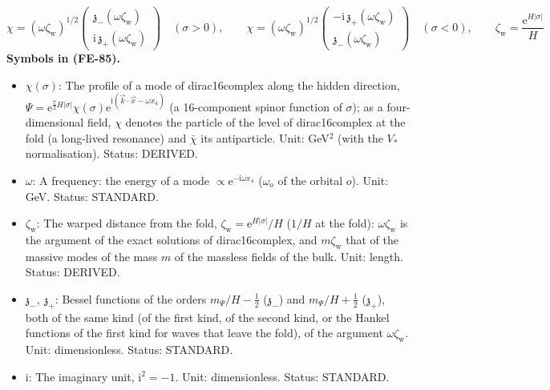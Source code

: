 \documentclass[
  10pt,
]{article}
\providecommand{\tightlist}{%
  \setlength{\itemsep}{0pt}\setlength{\parskip}{0pt}}
\begin{document}
\[
\chi = (\omega\zeta_{\mathrm{w}})^{1/2}\begin{pmatrix}\mathfrak{z}_-(\omega\zeta_{\mathrm{w}})\\ \mathrm{i}\,\mathfrak{z}_+(\omega\zeta_{\mathrm{w}})\end{pmatrix}\quad(\sigma > 0),\qquad
\chi = (\omega\zeta_{\mathrm{w}})^{1/2}\begin{pmatrix}-\mathrm{i}\,\mathfrak{z}_+(\omega\zeta_{\mathrm{w}})\\ \mathfrak{z}_-(\omega\zeta_{\mathrm{w}})\end{pmatrix}\quad(\sigma < 0),\qquad
\zeta_{\mathrm{w}} = \frac{\mathrm{e}^{H\lvert\sigma\rvert}}{H} \tag{FE-85}
\] \textbf{Symbols in (FE-85).}

\begin{itemize}
\tightlist
\item
  \(\chi(\sigma)\): The profile of a mode of dirac16complex along the
  hidden direction,
  \(\Psi = \mathrm{e}^{\frac72H\lvert\sigma\rvert}\chi(\sigma)\mathrm{e}^{\mathrm{i}(\vec k\cdot\vec x - \omega x_4)}\)
  (a 16-component spinor function of \(\sigma\)); as a four-dimensional
  field, \(\chi\) denotes the particle of the level of dirac16complex at
  the fold (a long-lived resonance) and \(\bar\chi\) its antiparticle.
  Unit: GeV\(^{2}\) (with the \(V_*\) normalisation). Status: DERIVED.
\item
  \(\omega\): A frequency: the energy of a mode
  \(\propto \mathrm{e}^{-\mathrm{i}\omega x_4}\) (\(\omega_o\) of the
  orbital \(o\)). Unit: GeV. Status: STANDARD.
\item
  \(\zeta_{\mathrm{w}}\): The warped distance from the fold,
  \(\zeta_{\mathrm{w}} = \mathrm{e}^{H\lvert\sigma\rvert}/H\) (\(1/H\)
  at the fold): \(\omega\zeta_{\mathrm{w}}\) is the argument of the
  exact solutions of dirac16complex, and \(m\zeta_{\mathrm{w}}\) that of
  the massive modes of the mass \(m\) of the massless fields of the
  bulk. Unit: length. Status: DERIVED.
\item
  \(\mathfrak{z}_-,\ \mathfrak{z}_+\): Bessel functions of the orders
  \(m_\Psi/H - \frac12\) (\(\mathfrak{z}_-\)) and \(m_\Psi/H + \frac12\)
  (\(\mathfrak{z}_+\)), both of the same kind (of the first kind, of the
  second kind, or the Hankel functions of the first kind for waves that
  leave the fold), of the argument \(\omega\zeta_{\mathrm{w}}\). Unit:
  dimensionless. Status: STANDARD.
\item
  \(\mathrm{i}\): The imaginary unit, \(\mathrm{i}^2 = -1\). Unit:
  dimensionless. Status: STANDARD.

\end{itemize}
\end{document}
